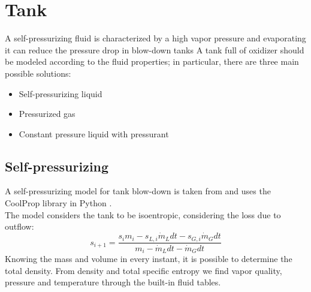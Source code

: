\newpage
\chapter{Tank}
A self-pressurizing fluid is characterized by a high vapor pressure and evaporating it can reduce the pressure drop in blow-down tanks
A tank full of oxidizer should be modeled according to the fluid properties; in particular, there are three main possible solutions:
\begin{itemize}
    \item Self-pressurizing liquid
    \item Pressurized gas
    \item Constant pressure liquid with pressurant
\end{itemize}
\section{Self-pressurizing}
A self-pressurizing model for tank blow-down is taken from \cite{Selfpress} and uses the CoolProp library in Python \cite{doi:10.1021/ie4033999}.\\
The model considers the tank to be isoentropic, considering the loss due to outflow:\\
\begin{equation}
    {s_{i+1}=\frac{s_{i}m_i-s_{L,i} \dot{m}_Ldt-s_{G,i} \dot{m}_Gdt}{m_i - \dot{m}_Ldt - \dot{m}_Gdt}}
\end{equation}
Knowing the mass and volume in every instant, it is possible to determine the total density. From density and total specific entropy we find vapor quality, pressure and temperature through the built-in fluid tables.\\

